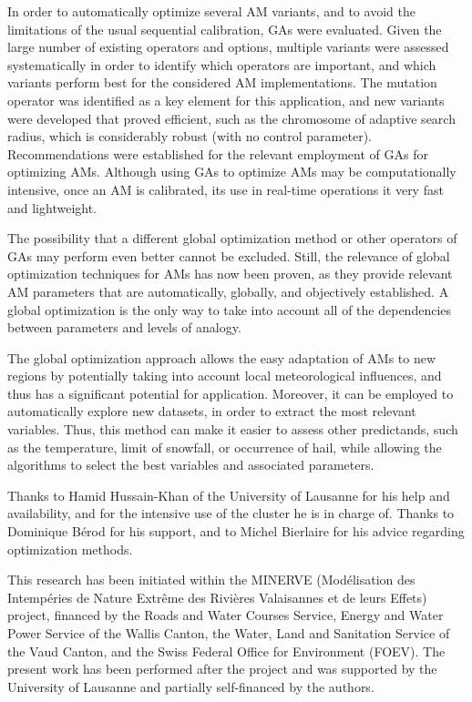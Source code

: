 \documentclass{ametsoc}
\begin{document}
In order to automatically optimize several AM variants, and to avoid the limitations of the usual sequential calibration, GAs were evaluated. Given the large number of existing operators and options, multiple variants were assessed systematically in order to identify which operators are important, and which variants perform best for the considered AM implementations. The mutation operator was identified as a key element for this application, and new variants were developed that proved efficient, such as the chromosome of adaptive search radius, which is considerably robust (with no control parameter). Recommendations were established for the relevant employment of GAs for optimizing AMs. Although using GAs to optimize AMs may be computationally intensive, once an AM is calibrated, its use in real-time operations it very fast and lightweight.

The possibility that a different global optimization method or other operators of GAs may perform even better cannot be excluded. Still, the relevance of global optimization techniques for AMs has now been proven, as they provide relevant AM parameters that are automatically, globally, and objectively established. A global optimization is the only way to take into account all of the dependencies between parameters and levels of analogy.

The global optimization approach allows the easy adaptation of AMs to new regions by potentially taking into account local meteorological influences, and thus has a significant potential for application. Moreover, it can be employed to automatically explore new datasets, in order to extract the most relevant variables. Thus, this method can make it easier to assess other predictands, such as the temperature, limit of snowfall, or occurrence of hail, while allowing the algorithms to select the best variables and associated parameters.


%
\acknowledgments
Thanks to Hamid Hussain-Khan of the University of Lausanne for his help and availability, and for the intensive use of the cluster he is in charge of. Thanks to Dominique B\'{e}rod for his support, and to Michel Bierlaire for his advice regarding optimization methods.

This research has been initiated within the MINERVE (Mod\'{e}lisation des Intemp\'{e}ries de Nature Extr\^{e}me des Rivi\`{e}res Valaisannes et de leurs Effets) project, financed by the Roads and Water Courses Service, Energy and Water Power Service of the Wallis Canton, the Water, Land and Sanitation Service of the Vaud Canton, and the Swiss Federal Office for Environment (FOEV). The present work has been performed after the project and was supported by the University of Lausanne and partially self-financed by the authors.
\end{document}
